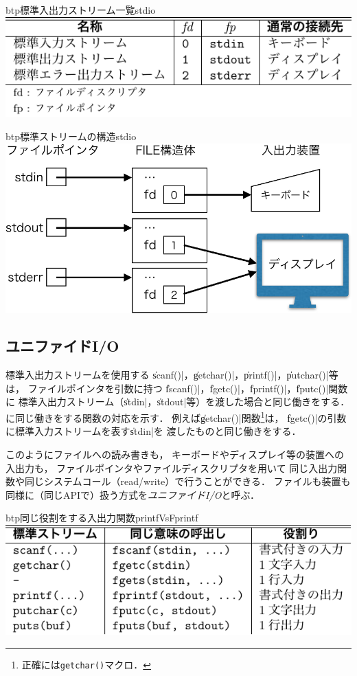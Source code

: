 \begin{mytable}{btp}{標準入出力ストリーム一覧}{stdio}
  \includegraphics[scale=1.0]{Tbl/stdio.pdf}
\end{mytable}

\begin{myfig}{btp}{標準ストリームの構造}{stdio}
\includegraphics[scale=0.7]{Fig/stdio-crop.pdf}
\end{myfig}

\subsection{ユニファイドI/O}
標準入出力ストリームを使用する
\|scanf()|，\|getchar()|，\|printf()|，\|putchar()|等は，
ファイルポインタを引数に持つ
\|fscanf()|，\|fgetc()|，\|fprintf()|，\|fputc()|関数に
標準入出力ストリーム（\|stdin|，\|stdout|等）を渡した場合と同じ働きをする．
に同じ働きをする関数の対応を示す．
例えば\|getchar()|関数\footnote{正確には\texttt{getchar()}マクロ．}は，
\|fgetc()|の引数に標準入力ストリームを表す\|stdin|を
渡したものと同じ働きをする．

このようにファイルへの読み書きも，
キーボードやディスプレイ等の装置への入出力も，
ファイルポインタやファイルディスクリプタを用いて
同じ入出力関数や同じシステムコール（read/write）で行うことができる．
ファイルも装置も同様に（同じAPIで）扱う方式を{\em ユニファイドI/O}と呼ぶ．

\begin{mytable}{btp}{同じ役割をする入出力関数}{printfVsFprintf}
  \includegraphics[scale=1.0]{Tbl/printfVsFprintf.pdf}
\end{mytable}

